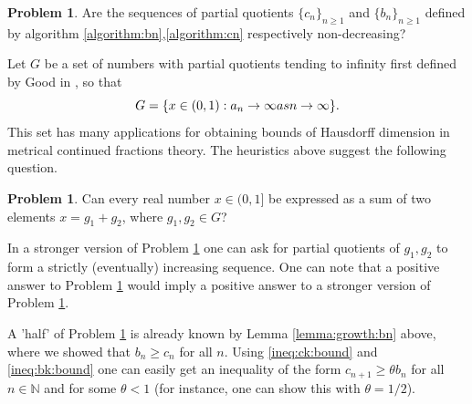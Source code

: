 \documentclass{amsart}
\theoremstyle{definition}
\newtheorem{problem}[theorem]{Problem}
\newcommand{\N}{\mathbb N}%
\newcommand{\0}{\mbf 0}%
\renewcommand{\text}{\textup}
\def\N{\mathbb N}
\begin{document}
\begin{problem}\label{problem1}
Are the sequences of partial quotients $\{c_n\}_{n\geq1}$ and $\{b_n\}_{n\geq1}$ defined by algorithm \eqref{algorithm:bn},\eqref{algorithm:cn} respectively non-decreasing? 
\end{problem}

Let $G$ be a set of numbers with partial quotients tending to infinity first defined by Good in \cite{MR0004878}, so that
$$
G = \{ x\in(0,1) : a_n \to\infty \text{ as } n\to\infty \}.
$$
This set has many applications for obtaining bounds of Hausdorff dimension in metrical continued fractions theory. The heuristics above suggest the following question.
\begin{problem}\label{problem2}
    Can every real number $x\in(0,1]$ be expressed as a sum of two elements $x=g_1+g_2$, where $g_1,g_2\in G$?
\end{problem}
In a stronger version of Problem \ref{problem2} one can ask for partial quotients of $g_1,g_2$ to form a strictly (eventually) increasing sequence. One can note that a positive answer to Problem \ref{problem1} would imply a positive answer to a stronger version of Problem \ref{problem2}.

A 'half' of Problem \ref{problem1} is already known by Lemma \ref{lemma:growth:bn} above, where we showed that $b_n\geq c_n$ for all $n$. Using \eqref{ineq:ck:bound} and \eqref{ineq:bk:bound} one can easily get an inequality of the form $c_{n+1}\geq \theta b_n$ for all $n\in\N$ and for some $\theta<1$ (for instance, one can show this with $\theta=1/2$).














\end{document}

